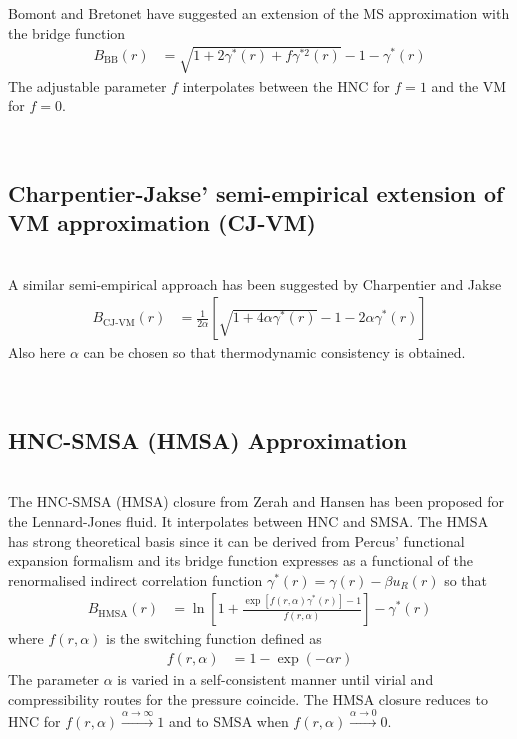 Bomont and Bretonet \cite{Bomont2003,Bomont2004} have suggested an
extension of the MS approximation with the bridge function
\begin{align}
B_\text{BB}(r) &=
\sqrt{1+2\gamma^*(r)+f\gamma^{*2}(r)}-1-\gamma^*(r)
\end{align}
The adjustable parameter $f$ interpolates between the HNC for $f=1$ and the
VM for $f=0$.

\vphantom{.}~\\
\subsection{Charpentier-Jakse' semi-empirical extension of VM approximation (CJ-VM)}
~\\

A similar semi-empirical approach has been suggested by Charpentier and Jakse
\cite{Charpentier2001}
\begin{align}
B_\text{CJ-VM}(r) &= \frac{1}{2\alpha}\left[\sqrt{1+4\alpha
\gamma^*(r)}-1-2\alpha\gamma^*(r) \right]
\end{align}
Also here $\alpha$ can be chosen so that thermodynamic consistency is obtained.




~\\
\subsection{HNC-SMSA (HMSA) Approximation}
~\\

The HNC\hbox{-}SMSA (HMSA) closure from Zerah and Hansen  \cite{Zerah1986} has been proposed
for the Lennard-Jones fluid. It interpolates between HNC and SMSA. The HMSA has
strong theoretical basis since it can be derived from Percus' functional expansion
formalism and its bridge function expresses as a functional of the renormalised
indirect correlation function $\gamma^*(r)=\gamma(r)-\beta u_{R}(r)$ so that
\begin{align}
B_\text{HMSA}(r) &= \ln
\left[1+\frac{\exp\left[f(r,\alpha)\gamma^*(r)\right]-1}{f(r,\alpha)}\right]-\gamma^*(r)
\end{align}
where $f(r,\alpha)$ is the switching function defined as
\begin{align}
f(r,\alpha) &= 1-\exp(-\alpha r)
\end{align}
The parameter $\alpha$ is varied in a self-consistent manner until virial and
compressibility routes for the pressure coincide.
The HMSA closure reduces to HNC for $f(r,\alpha) \xrightarrow{\alpha\rightarrow\infty} 1$
and to SMSA when $f(r,\alpha) \xrightarrow{\alpha\rightarrow 0} 0$.

